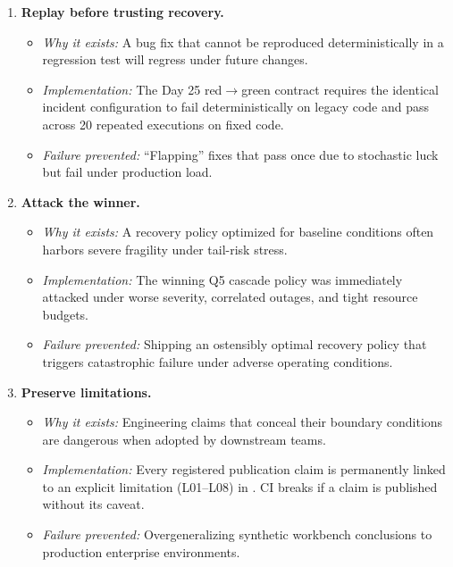 \begin{enumerate}
    \item \textbf{Replay before trusting recovery.}
    \begin{itemize}
        \item \textit{Why it exists:} A bug fix that cannot be reproduced deterministically in a regression test will regress under future changes.
        \item \textit{Implementation:} The Day 25 red$\to$green contract requires the identical incident configuration to fail deterministically on legacy code and pass across 20 repeated executions on fixed code.
        \item \textit{Failure prevented:} ``Flapping'' fixes that pass once due to stochastic luck but fail under production load.
    \end{itemize}

    \item \textbf{Attack the winner.}
    \begin{itemize}
        \item \textit{Why it exists:} A recovery policy optimized for baseline conditions often harbors severe fragility under tail-risk stress.
        \item \textit{Implementation:} The winning Q5 cascade policy was immediately attacked under worse severity, correlated outages, and tight resource budgets.
        \item \textit{Failure prevented:} Shipping an ostensibly optimal recovery policy that triggers catastrophic failure under adverse operating conditions.
    \end{itemize}

    \item \textbf{Preserve limitations.}
    \begin{itemize}
        \item \textit{Why it exists:} Engineering claims that conceal their boundary conditions are dangerous when adopted by downstream teams.
        \item \textit{Implementation:} Every registered publication claim is permanently linked to an explicit limitation (L01--L08) in . CI breaks if a claim is published without its caveat.
        \item \textit{Failure prevented:} Overgeneralizing synthetic workbench conclusions to production enterprise environments.
    \end{itemize}


\end{enumerate}
